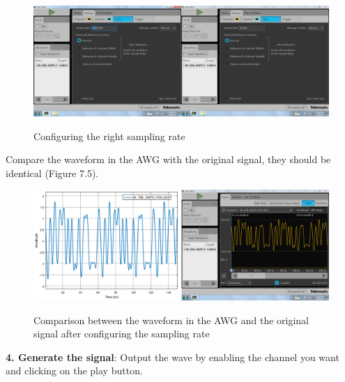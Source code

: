 \begin{figure}[h]
	\centering
	\includegraphics[width=\textwidth]{../mtools/sgnToWfm/figures/tutorial3}
	\label{TUT_ConfigSR}\caption{Configuring the right sampling rate}
\end{figure}
\bigskip

Compare the waveform in the AWG with the original signal, they should be identical (Figure 7.5).

\begin{figure}[h]
	\centering
	\includegraphics[width=\textwidth]{../mtools/sgnToWfm/figures/tutorial4}
	\label{TUT_CompGood}\caption{Comparison between the waveform in the AWG and the original signal after configuring the sampling rate}
\end{figure}
\bigskip

\noindent
\textbf{4. Generate the signal}: 
Output the wave by enabling the channel you want and clicking on the play button.


% 